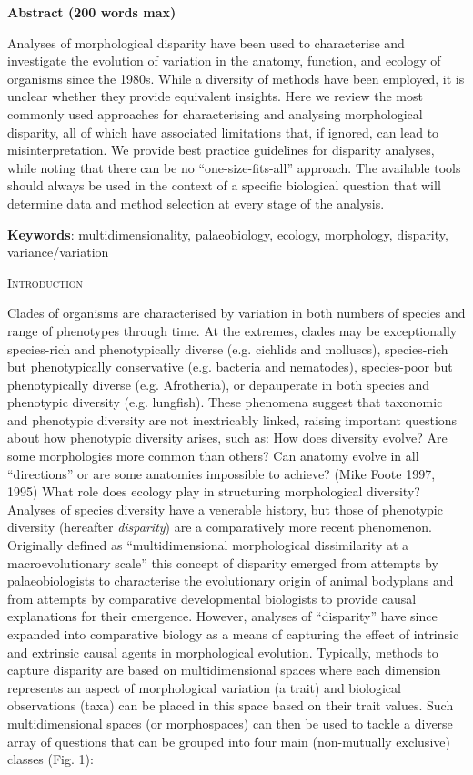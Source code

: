 \documentclass[12pt,letterpaper]{article}
\renewcommand{\section}[1]{%
\bigskip
\begin{center}
\begin{Large}
\normalfont\scshape #1
\medskip
\end{Large}
\end{center}}
\begin{document}
\textbf{Abstract (200 words max)}

Analyses of morphological disparity have been used to characterise and investigate the evolution of variation in the anatomy, function, and ecology of organisms since the 1980s.
While a diversity of methods have been employed, it is unclear whether they provide
equivalent insights.
Here we review the most commonly used approaches for characterising and analysing morphological disparity, all of which have associated limitations that, if ignored, can lead to misinterpretation.
We provide best practice guidelines for disparity analyses, while noting that there can be no ``one-size-fits-all'' approach.
The available tools should always be used in the context of a specific biological question that will determine data and method selection at every stage of the analysis.

\textbf{Keywords}: multidimensionality, palaeobiology, ecology,
morphology, disparity, variance/variation

\section{Introduction}

Clades of organisms are characterised by variation in both numbers of species and range of phenotypes through time.
At the extremes, clades may be exceptionally species-rich and phenotypically diverse (e.g. cichlids and molluscs), species-rich but phenotypically conservative (e.g. bacteria and nematodes), species-poor but phenotypically diverse (e.g. Afrotheria), or depauperate in both species and phenotypic diversity (e.g. lungfish).
These phenomena suggest that taxonomic and phenotypic diversity are not inextricably linked, raising important questions about how phenotypic diversity arises, such as:
How does diversity evolve?
Are some morphologies more common than others?
Can anatomy evolve in all ``directions'' or are some anatomies impossible to achieve? (Mike Foote 1997, 1995)
What role does ecology play in structuring morphological diversity?
Analyses of species diversity have a venerable history, but those of phenotypic diversity (hereafter \emph{disparity}) are a comparatively more recent phenomenon. Originally defined as ``multidimensional morphological dissimilarity at a macroevolutionary scale'' \citep{runnegar1987rates,Gould1991-nh} this concept of disparity emerged from attempts by palaeobiologists to characterise the evolutionary origin of animal bodyplans and from attempts by comparative developmental biologists to provide causal explanations for their emergence.
However, analyses of ``disparity'' have since expanded into comparative biology as a means of capturing the effect of intrinsic and extrinsic causal agents in morphological evolution.
Typically, methods to capture disparity are based on multidimensional spaces where each dimension represents an aspect of morphological variation (a trait) and biological observations (taxa) can be placed in this space based on their trait values.
Such multidimensional spaces (or morphospaces) can then be used to tackle a diverse array of questions that can be grouped into four main (non-mutually exclusive) classes (Fig. 1):
\end{document}
